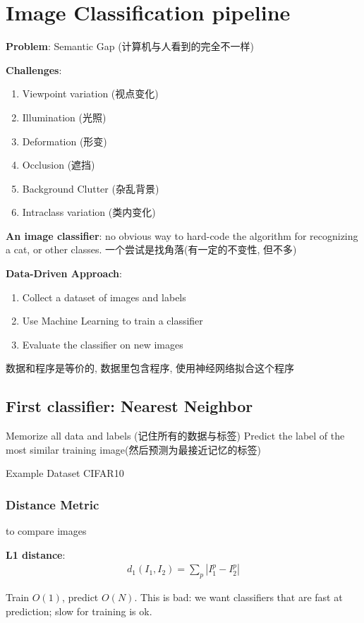 \newpage
\section{Image Classification pipeline}

\textbf{Problem}: Semantic Gap (计算机与人看到的完全不一样)

\textbf{Challenges}:
\begin{enumerate}
    \item Viewpoint variation (视点变化)
    \item Illumination (光照)
    \item Deformation (形变)
    \item Occlusion (遮挡)
    \item Background Clutter (杂乱背景)
    \item Intraclass variation (类内变化)
\end{enumerate}

\textbf{An image classifier}: 
no obvious way to hard-code the algorithm for recognizing a cat, or other classes. 一个尝试是找角落(有一定的不变性, 但不多)

\textbf{Data-Driven Approach}:
\begin{enumerate}
    \item Collect a dataset of images and labels
    \item Use Machine Learning to train a classifier
    \item Evaluate the classifier on new images
\end{enumerate}
数据和程序是等价的, 数据里包含程序, 使用神经网络拟合这个程序

\subsection{First classifier: Nearest Neighbor}
Memorize all data and labels (记住所有的数据与标签)
Predict the label of the most similar training image(然后预测为最接近记忆的标签)

Example Dataset CIFAR10 
\subsubsection{Distance Metric} to compare images 

\textbf{L1 distance}:
\begin{align*}
    d_1(I_1, I_2)=\sum_p |I_1^p -I_2^p|
\end{align*}

Train $O(1)$, predict $O(N)$. This is bad: we want classifiers that are fast at prediction; slow for training is ok. 

